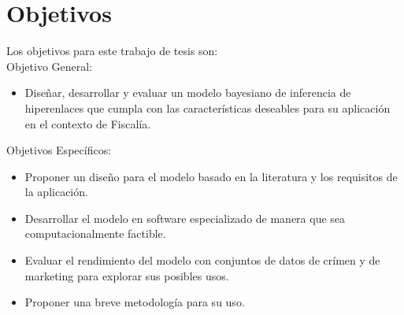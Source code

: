 \section{Objetivos}

Los objetivos para este trabajo de tesis son:\\

Objetivo General:
\begin{itemize}
    \item Diseñar, desarrollar y evaluar un modelo bayesiano de inferencia de hiperenlaces que cumpla con las características deseables para su aplicación en el contexto de Fiscalía.\\
\end{itemize}


Objetivos Específicos:
\begin{itemize}
    \item Proponer un diseño para el modelo basado en la literatura y los requisitos de la aplicación.
    \item Desarrollar el modelo en software especializado de manera que sea computacionalmente factible.
    \item Evaluar el rendimiento del modelo con conjuntos de datos de crímen y de marketing para explorar sus posibles usos.
    \item Proponer una breve metodología para su uso.
\end{itemize}